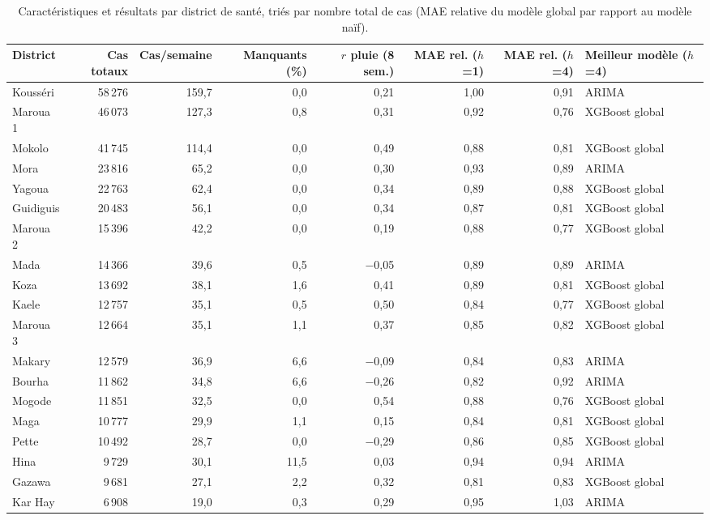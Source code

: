 \begin{table}[!htbp]\centering\scriptsize\setlength{\tabcolsep}{4pt}
\caption{Caractéristiques et résultats par district de santé, triés par nombre total de cas (MAE relative du modèle global par rapport au modèle naïf).}\label{tab:annexe}
\begin{tabular}{@{}lrrrrrrl@{}}\toprule
District & Cas totaux & Cas/semaine & Manquants (\%) & $r$ pluie (8 sem.) & MAE rel. ($h$=1) & MAE rel. ($h$=4) & Meilleur modèle ($h$=4) \\\midrule
Kousséri & 58\,276 & 159,7 & 0,0 & 0,21 & 1,00 & 0,91 & ARIMA \\
Maroua 1 & 46\,073 & 127,3 & 0,8 & 0,31 & 0,92 & 0,76 & XGBoost global \\
Mokolo & 41\,745 & 114,4 & 0,0 & 0,49 & 0,88 & 0,81 & XGBoost global \\
Mora & 23\,816 & 65,2 & 0,0 & 0,30 & 0,93 & 0,89 & ARIMA \\
Yagoua & 22\,763 & 62,4 & 0,0 & 0,34 & 0,89 & 0,88 & XGBoost global \\
Guidiguis & 20\,483 & 56,1 & 0,0 & 0,34 & 0,87 & 0,81 & XGBoost global \\
Maroua 2 & 15\,396 & 42,2 & 0,0 & 0,19 & 0,88 & 0,77 & XGBoost global \\
Mada & 14\,366 & 39,6 & 0,5 & $-$0,05 & 0,89 & 0,89 & ARIMA \\
Koza & 13\,692 & 38,1 & 1,6 & 0,41 & 0,89 & 0,81 & XGBoost global \\
Kaele & 12\,757 & 35,1 & 0,5 & 0,50 & 0,84 & 0,77 & XGBoost global \\
Maroua 3 & 12\,664 & 35,1 & 1,1 & 0,37 & 0,85 & 0,82 & XGBoost global \\
Makary & 12\,579 & 36,9 & 6,6 & $-$0,09 & 0,84 & 0,83 & ARIMA \\
Bourha & 11\,862 & 34,8 & 6,6 & $-$0,26 & 0,82 & 0,92 & ARIMA \\
Mogode & 11\,851 & 32,5 & 0,0 & 0,54 & 0,88 & 0,76 & XGBoost global \\
Maga & 10\,777 & 29,9 & 1,1 & 0,15 & 0,84 & 0,81 & XGBoost global \\
Pette & 10\,492 & 28,7 & 0,0 & $-$0,29 & 0,86 & 0,85 & XGBoost global \\
Hina & 9\,729 & 30,1 & 11,5 & 0,03 & 0,94 & 0,94 & ARIMA \\
Gazawa & 9\,681 & 27,1 & 2,2 & 0,32 & 0,81 & 0,83 & XGBoost global \\
Kar Hay & 6\,908 & 19,0 & 0,3 & 0,29 & 0,95 & 1,03 & ARIMA \\

\end{tabular}
\end{table}
